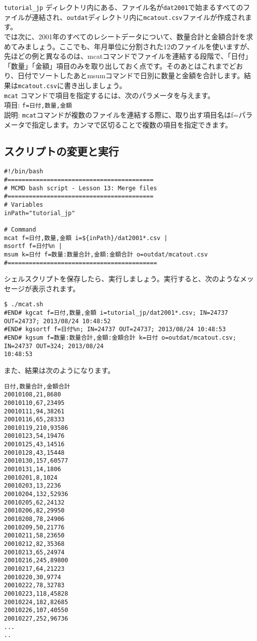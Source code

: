 \verb|tutorial_jp| ディレクトリ内にある、ファイル名が\verb|dat2001|で始まるすべてのファイルが連結され、\verb|outdat|ディレクトリ内に\verb|mcatout.csv|ファイルが作成されます。\\

では次に、2001年のすべてのレシートデータについて、数量合計と金額合計を求めてみましょう。ここでも、年月単位に分割された12のファイルを使いますが、先ほどの例と異なるのは、mcatコマンドでファイルを連結する段階で、「日付」「数量」「金額」項目のみを取り出しておく点です。そのあとはこれまでどおり、日付でソートしたあとmsumコマンドで日別に数量と金額を合計します。結果は\verb|mcatout.csv|に書き出しましょう。\\

\verb|mcat| コマンドで項目を指定するには、次のパラメータを与えます。\\

項目: \verb|f=日付,数量,金額| \\
説明: \verb|mcat|コマンドが複数のファイルを連結する際に、取り出す項目名はf=パラメータで指定します。カンマで区切ることで複数の項目を指定できます。

\subsection{スクリプトの変更と実行}
 
\begin{verbatim}
#!/bin/bash
#=========================================
# MCMD bash script - Lesson 13: Merge files
#=========================================
# Variables
inPath="tutorial_jp"

# Command 
mcat f=日付,数量,金額 i=${inPath}/dat2001*.csv | 
msortf f=日付%n |   
msum k=日付 f=数量:数量合計,金額:金額合計 o=outdat/mcatout.csv
#==========================================
\end{verbatim}
 
シェルスクリプトを保存したら、実行しましょう。実行すると、次のようなメッセージが表示されます。

\begin{verbatim}
$ ./mcat.sh 
#END# kgcat f=日付,数量,金額 i=tutorial_jp/dat2001*.csv; IN=24737 OUT=24737; 2013/08/24 10:48:52
#END# kgsortf f=日付%n; IN=24737 OUT=24737; 2013/08/24 10:48:53
#END# kgsum f=数量:数量合計,金額:金額合計 k=日付 o=outdat/mcatout.csv; IN=24737 OUT=324; 2013/08/24
10:48:53
\end{verbatim}

また、結果は次のようになります。

 \begin{verbatim}
日付,数量合計,金額合計
20010108,21,8680
20010110,67,23495
20010111,94,38261
20010116,65,28333
20010119,210,93586
20010123,54,19476
20010125,43,14516
20010128,43,15448
20010130,157,60577
20010131,14,1806
20010201,8,1024
20010203,13,2236
20010204,132,52936
20010205,62,24132
20010206,82,29950
20010208,78,24906
20010209,50,21776
20010211,58,23650
20010212,82,35368
20010213,65,24974
20010216,245,89800
20010217,64,21223
20010220,30,9774
20010222,78,32783
20010223,118,45828
20010224,182,82685
20010226,107,40550
20010227,252,96736
...
..
\end{verbatim}


